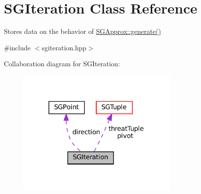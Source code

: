 \hypertarget{classSGIteration}{}\section{S\+G\+Iteration Class Reference}
\label{classSGIteration}


Stores data on the behavior of \hyperlink{classSGApprox_a9cf7330f7cab3f454b0850e778d132fa}{S\+G\+Approx\+::generate()}  




{\ttfamily \#include $<$sgiteration.\+hpp$>$}



Collaboration diagram for S\+G\+Iteration\+:
\nopagebreak
\begin{figure}[H]
\begin{center}
\leavevmode
\includegraphics[width=228pt]{classSGIteration__coll__graph}
\end{center}
\end{figure}
